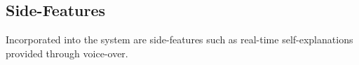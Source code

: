 \subsection{Side-Features}
Incorporated into the system are side-features such
as real-time self-explanations provided through voice-over.
